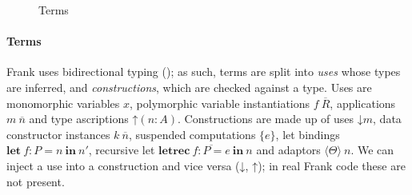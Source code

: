 \documentclass[msc,deptreport,cs]{infthesis} %
\makeatletter
\newcommand\figscale{0.9}
\newcommand{\many}{\overline}
\newcommand\ba{\begin{array}}
\newcommand\ea{\end{array}}
\newenvironment{syntax}{\[\ba{@{}l@{~}r@{~}c@{~}l@{}}}{\ea\]\ignorespacesafterend}
\newcommand{\adapt}{\Theta}
\newcommand{\key}[1]{\mathbf{#1}} %
\newcommand{\handleSymbol}{\rightarrow}
\newcommand{\handle}[2]{{#1} \handleSymbol {#2}}
\newcommand{\thunk}[1]{\{{#1}\}}
\newcommand\slab[1]{(\textrm{#1})}
\newcommand{\effin}[1]{\langle {#1} \rangle}
\newcommand{\uc}{\mathord{\downarrow}}
\newcommand{\cu}{\mathord{\uparrow}}
\newcommand{\gor}{\mid}
\makeatother
\begin{document}
\begin{figure} %
\centering
\scalebox{\figscale}{%
\begin{syntax}
  \slab{constructors}               & k \\
  \slab{commands}                   & c \\
  \slab{uses}                 & m      &::= &
     x \gor f~\many{R} \gor m~\many{n} \gor \cu(n:A) \\
  \slab{constructions}        & n      &::= &
    \uc m \gor k~\many{n} \gor c~\many{R}~\many{n} \gor \thunk{e} \\
                              &        &\gor& \key{let}~f : P = n~\key{in}~n'
                                   \gor
                                   \key{letrec}~\many{f : P = e}~\key{in}~n \\
                              &        &\gor&  \effin{\adapt}~n \\
  \slab{computations}         & e      &::=& \many{\many{r} \mapsto n}
  \\
  \slab{computation patterns} & r      &::=& p
                                        \gor \effin{\handle{c~\many{p}\,}{z}}
                                        \gor \effin{x} \\
  \slab{value patterns}       & p      &::=& k~\many{p} \gor x        \\
\end{syntax}
}
\caption{Terms}
\label{fig:terms}
\end{figure}

\paragraph*{Terms} Frank uses bidirectional typing (\cite{pierce2000local}); as such, terms are
split into \emph{uses} whose types are inferred, and \emph{constructions}, which
are checked against a type. Uses are monomorphic variables $x$, polymorphic
variable instantiations $f~\many{R}$, applications $m~\many{n}$ and type
ascriptions $\cu(n:A)$. Constructions are made up of uses $\uc m$, data
constructor instances $k~\many{n}$, suspended computations $\thunk{e}$, let
bindings $\key{let}~f : P = n~\key{in}~n'$, recursive let $\key{letrec}~\many{f
  : P = e}~\key{in}~n$ and adaptors $\effin{\adapt}~n$. We can inject a use into
a construction and vice versa ($\uc$, $\cu$); in real Frank code these are not
present.
\end{document}
